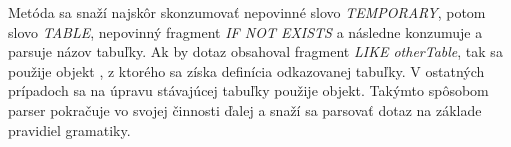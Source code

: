 Metóda  sa snaží najskôr skonzumovať nepovinné slovo \textit{TEMPORARY}, potom slovo \textit{TABLE}, nepovinný fragment \textit{IF NOT EXISTS} a následne konzumuje a parsuje názov tabuľky. Ak by dotaz obsahoval fragment \textit{LIKE otherTable}, tak sa použije objekt , z ktorého sa získa definícia odkazovanej tabuľky. V ostatných prípadoch sa na úpravu stávajúcej tabuľky použije  objekt. Takýmto spôsobom parser pokračuje vo svojej činnosti ďalej a snaží sa parsovať dotaz na základe pravidiel gramatiky.
